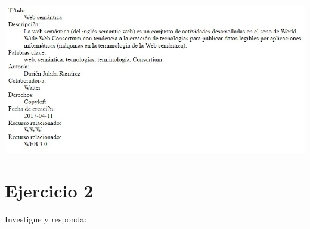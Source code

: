 \documentclass[a4paper,12pt,oneside,final,spanish]{article}
\begin{document}
\begin{enumerate}[a.]
\begin{center}
\includegraphics[width=0.9\linewidth,keepaspectratio]{wshtm}
\end{center}
\end{enumerate}

\section*{Ejercicio 2}

Investigue y responda:
\end{document}
